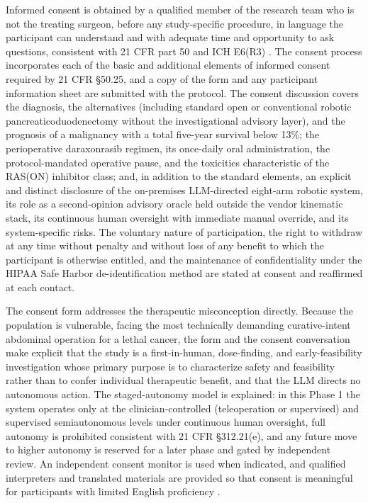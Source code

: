 Informed consent is obtained by a qualified member of the research team who is not
the treating surgeon, before any study-specific procedure, in language the
participant can understand and with adequate time and opportunity to ask questions,
consistent with 21 CFR part 50 and ICH E6(R3) \cite{cfr050paiuni,ichpaistduni}. The
consent process incorporates each of the basic and additional elements of informed
consent required by 21 CFR \S 50.25, and a copy of the form and any participant
information sheet are submitted with the protocol. The consent discussion covers the
diagnosis, the alternatives (including standard open or conventional robotic
pancreaticoduodenectomy without the investigational advisory layer), and the
prognosis of a malignancy with a total five-year survival below 13\%; the
perioperative daraxonrasib regimen, its once-daily oral administration, the
protocol-mandated operative pause, and the toxicities characteristic of the RAS(ON)
inhibitor class; and, in addition to the standard elements, an explicit and distinct
disclosure of the on-premises LLM-directed eight-arm robotic system, its role as a
second-opinion advisory oracle held outside the vendor kinematic stack, its
continuous human oversight with immediate manual override, and its system-specific
risks. The voluntary nature of participation, the right to withdraw at any time
without penalty and without loss of any benefit to which the participant is otherwise
entitled, and the maintenance of confidentiality under the HIPAA Safe Harbor
de-identification method are stated at consent and reaffirmed at each contact.

The consent form addresses the therapeutic misconception directly. Because the
population is vulnerable, facing the most technically demanding curative-intent
abdominal operation for a lethal cancer, the form and the consent conversation make
explicit that the study is a first-in-human, dose-finding, and early-feasibility
investigation whose primary purpose is to characterize safety and feasibility rather
than to confer individual therapeutic benefit, and that the LLM directs no autonomous
action. The staged-autonomy model is explained: in this Phase 1 the system operates
only at the clinician-controlled (teleoperation or supervised) and supervised
semiautonomous levels under continuous human oversight, full autonomy is prohibited
consistent with 21 CFR \S 312.21(e), and any future move to higher autonomy is
reserved for a later phase and gated by independent review. An independent consent
monitor is used when indicated, and qualified interpreters and translated materials
are provided so that consent is meaningful for participants with limited English
proficiency \cite{clintrustpai,oncotrialllm}.

